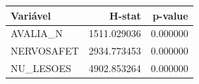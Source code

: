 \begin{tabular}{lrr}
\toprule
Variável & H-stat & p-value \\
\midrule
AVALIA\_N & 1511.029036 & 0.000000 \\
NERVOSAFET & 2934.773453 & 0.000000 \\
NU\_LESOES & 4902.853264 & 0.000000 \\
\bottomrule
\end{tabular}
